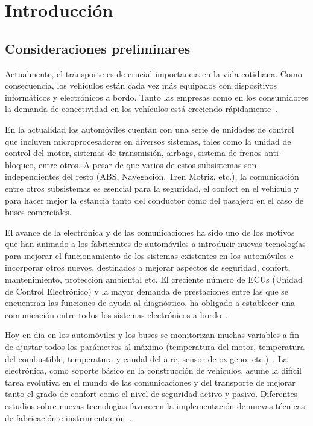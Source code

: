 

\chapter[Introducción]{Introducción}

\section{Consideraciones preliminares}

Actualmente, el transporte es de crucial importancia en la vida cotidiana. Como consecuencia, los vehículos están cada vez más equipados con dispositivos informáticos y electrónicos a bordo. 
Tanto las empresas como en los consumidores la demanda de conectividad en los vehículos está creciendo rápidamente~\cite{VWC}.

En la actualidad los automóviles cuentan con una serie de unidades de control que incluyen microprocesadores en diversos sistemas, tales como la unidad de control del motor, sistemas de transmisión, airbags, sistema de frenos anti-bloqueo, entre otros. 
A pesar de que varios de estos subsistemas son independientes del resto (ABS, Navegación, Tren Motriz, etc.), la comunicación entre otros subsistemas es esencial para la seguridad, el confort en el vehículo y para hacer mejor la estancia tanto del conductor como del pasajero en el caso de buses comerciales.

 El avance de la electrónica y de las comunicaciones ha sido uno de los motivos que han animado a los fabricantes de automóviles a introducir nuevas tecnologías para mejorar el funcionamiento de los sistemas existentes en los automóviles e incorporar otros nuevos, destinados a mejorar aspectos de seguridad, confort, mantenimiento, protección ambiental etc. 
 El creciente número de ECUs (Unidad de Control Electrónico) y la mayor demanda de prestaciones entre las que se encuentran las funciones de ayuda al diagnóstico, ha obligado a establecer una comunicación entre todos los sistemas electrónicos a bordo~\cite{EA}.

Hoy en día en los automóviles y los buses se monitorizan muchas variables a fin de ajustar todos los parámetros al máximo (temperatura del motor, temperatura del combustible, temperatura y caudal del aire, sensor de oxigeno, etc.)~\cite{DUCE}. 
La electrónica, como soporte básico en la construcción de vehículos, asume la difícil tarea evolutiva en el mundo de las comunicaciones y del transporte de  mejorar tanto el grado de confort como el nivel de seguridad activo y pasivo. 
Diferentes estudios sobre nuevas tecnologías favorecen la implementación de nuevas técnicas de fabricación e instrumentación~\cite{TSA}.


